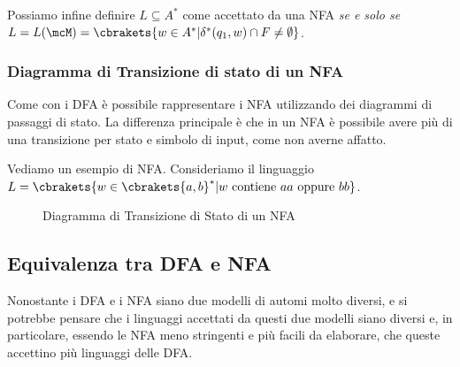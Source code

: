 Possiamo infine definire \(L\subseteq A^*\) come accettato da una NFA \textit{se e solo se} \(L=L(\mcM) = \cbrakets{w \in A^* \vert \delta^*(q_1,w) \cap F \neq \emptyset}\).

\subsubsection{Diagramma di Transizione di stato di un NFA}

Come con i DFA è possibile rappresentare i NFA utilizzando dei diagrammi di passaggi di stato. La differenza principale è che in un NFA è possibile avere più di una transizione per stato e simbolo di input, come non averne affatto.

Vediamo un esempio di NFA. Consideriamo il linguaggio \(L=\cbrakets{w \in \cbrakets{a,b}^* \vert w \text{ contiene } aa \text{ oppure } bb}\). %

\begin{figure}[ht]
  \centering
  \caption{Diagramma di Transizione di Stato di un NFA}\label{NFA Esempio}
\end{figure}

\subsection{Equivalenza tra DFA e NFA}

Nonostante i DFA e i NFA siano due modelli di automi molto diversi, e si potrebbe pensare che i linguaggi accettati da questi due modelli siano diversi e, in particolare, essendo le NFA meno stringenti e più facili da elaborare, che queste accettino più linguaggi delle DFA. %

